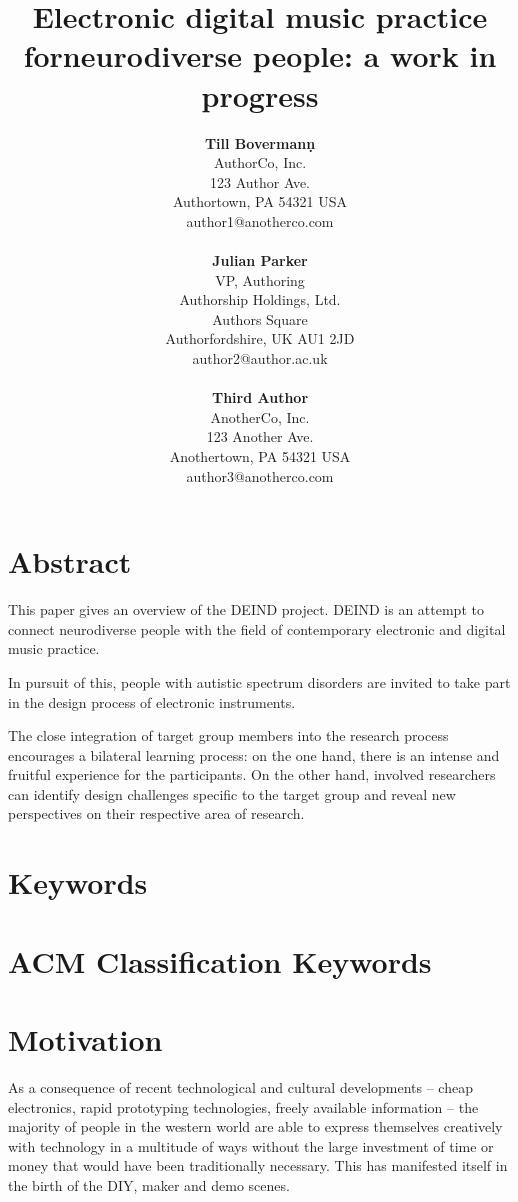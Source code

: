 \documentclass{chi-ext}
\title{Electronic digital music practice for\newline neurodiverse people: a work in progress}
\author{
  \textbf{Till Bovermanṇ} \\
  AuthorCo, Inc. \\
  123 Author Ave. \\
  Authortown, PA 54321 USA \\
  author1@anotherco.com \\
  \\
  \textbf{Julian Parker} \\
  VP, Authoring \\
  Authorship Holdings, Ltd. \\
  Authors Square \\
  Authorfordshire, UK AU1 2JD \\
  author2@author.ac.uk \\
  \\
  \textbf{Third Author} \\
  AnotherCo, Inc. \\
  123 Another Ave. \\
  Anothertown, PA 54321 USA \\
  author3@anotherco.com \\
}
\begin{document}
\maketitle

\begin{multicols}{2}
  
\makeauthors
\makecopyright

\section{Abstract}
This paper gives an overview of the DEIND project. DEIND is an attempt to connect neurodiverse people with the field of contemporary electronic and digital music practice. 

In pursuit of this, people with autistic spectrum disorders are invited to take part in the design process of electronic instruments.

The close integration of target group members into the research process encourages a bilateral learning process: on the one hand, there is an intense and fruitful experience for the participants. On the other hand, involved researchers can identify design challenges specific to the target group and reveal new perspectives on their respective area of research.

\section{Keywords}
\makeatletter \@keywords \makeatother

\section{ACM Classification Keywords}
\makeatletter \@acmclassification \makeatother


\section{Motivation}

As a consequence of recent technological and cultural developments -- cheap electronics, rapid prototyping technologies, freely available information -- the majority of people in the western world are able to express themselves creatively with technology in a multitude of ways without the large investment of time or money that would have been traditionally necessary. 
This has manifested itself in the birth of the DIY, maker and demo scenes.


\end{multicols}
\end{document}
